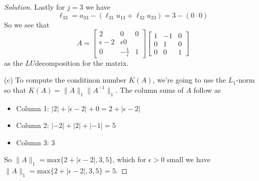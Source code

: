 \documentclass[12pt]{amsart}
\newenvironment{solution}
{\begin{proof}[Solution]}
{\end{proof}}
\begin{document}
\begin{onehalfspace}
\begin{solution}
            Lastly for $j=3$ we have
            \begin{displaymath}
                \ell_{33} = a_{33}-(\ell_{31}u_{13} + \ell_{32}u_{23}) = 3 - (0\cdot 0)
            \end{displaymath}
            So we see that
            \begin{displaymath}
                A = \left[\begin{matrix}
                              2 & 0 & 0\\
                              \epsilon-2 & \epsilon 0\\
                              0 & -\frac{1}{\epsilon} & 1
                \end{matrix}\right]
                \left[\begin{matrix}
                          1 & -1 & 0\\
                          0 & 1 & 0\\
                          0 & 0 & 1
                \end{matrix}\right]
            \end{displaymath}
            as the $LU$decomposition for the matrix.

            (c) To compute the conditinon number $K(A)$, we're going to use the $L_1$-norm
            so that $K(A)=\|A\|_1\|A^{-1}\|_1$.
            The column sums of $A$ follow as
            \begin{itemize}
                \item[-] Column 1: $|2| + |\epsilon - 2| + 0 = 2 + |\epsilon - 2|$
                \item[-] Column 2: $|-2| + |2| + |-1| = 5$
                \item[-] Column 3: $3$
            \end{itemize}
            So $\|A\|_1 = \text{max}\{2 + |\epsilon - 2|, 3, 5\}$, which for $\epsilon>0$ small
            we have $\|A\|_1 = \text{max}\{2 + |\epsilon - 2|, 3, 5\} = 5$.


\end{solution}
\end{onehalfspace}
\end{document}
